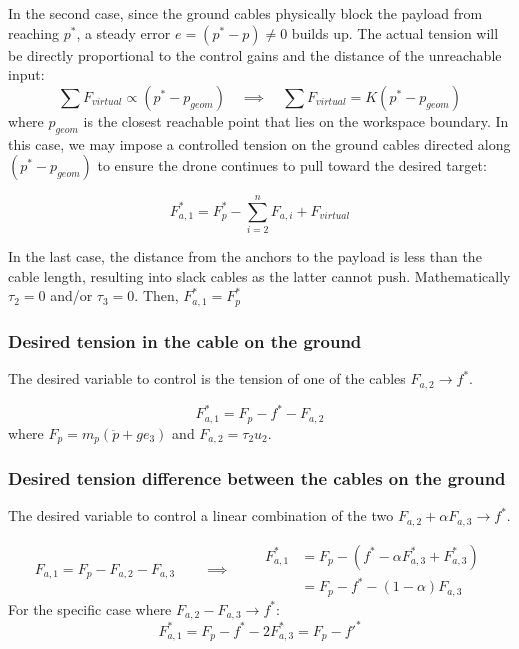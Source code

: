 In the second case, since the ground cables physically block the payload from reaching $p^*$, a steady error $e=(p^*-p)\ne 0$ builds up. The actual tension will be directly proportional to the control gains and the distance of the unreachable input:
\begin{equation}
    \sum F_{virtual} \propto (p^* - p_{geom}) \quad \implies \quad \sum F_{virtual} = K (p^* - p_{geom})
\end{equation}
where $p_{geom}$ is the closest reachable point that lies on the workspace boundary. In this case, we may impose a controlled tension on the ground cables directed along $(p^* - p_{geom})$ to ensure the drone continues to pull toward the desired target:

\begin{equation}
    F_{a, 1}^*=F_p^* -\sum_{i=2}^{n} F_{a, i} + F_{virtual}
\end{equation}

In the last case, the distance from the anchors to the payload is less than the cable length, resulting into slack cables as the latter cannot push. Mathematically $\tau_2= 0$ and/or $\tau_3=0$. Then, $F_{a,1}^*= F_p^*$

\subsubsection{Desired tension in the cable on the ground}
The desired variable to control is the tension of one of the cables $F_{a,2} \xrightarrow{} f^*$. 

\begin{equation}
    F_{a, 1}^*=F_p - f^* - F_{a,2}
\end{equation}
where $F_p = m_p (\ddot{p} + ge_3)$ and $F_{a, 2} = \tau_2u_2$.


\subsubsection{Desired tension difference between the cables on the ground}
The desired variable to control a linear combination of the two $F_{a, 2} + \alpha F_{a, 3} \xrightarrow{} f^*$.

\begin{equation}
    F_{a, 1} = F_p - F_{a, 2} - F_{a, 3} 
    \qquad \implies \qquad 
    \begin{aligned}
        F_{a,1}^* &= F_p - (f^* - \alpha F_{a, 3}^* + F_{a, 3}^*) \\
        &= F_p - f^* - (1-\alpha)F_{a, 3}
    \end{aligned}
\end{equation}
For the specific case where $F_{a, 2} - F_{a, 3} \to f^*$:
\begin{equation}
    F_{a,1}^* = F_p - f^* - 2F_{a, 3}^* = F_p - f'^*
\end{equation}
